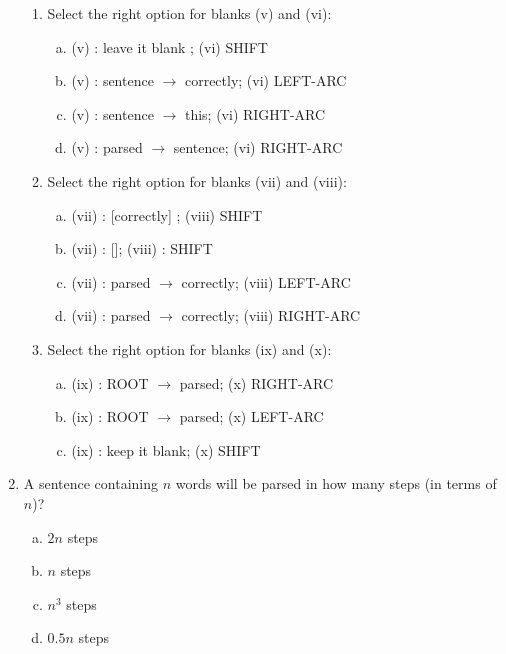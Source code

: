 \begin{enumerate}[1.]
\begin{enumerate}[4a.]

\item {} Select the right option for blanks (v) and (vi):

\begin{enumerate}[(a)]
\item (v) : leave it blank ; (vi) SHIFT
\item (v) : sentence $\rightarrow$ correctly; (vi) LEFT-ARC
\item (v) : sentence $\rightarrow$ this; (vi) RIGHT-ARC
\item (v) : parsed $\rightarrow$ sentence; (vi) RIGHT-ARC
\end{enumerate}


\item {} Select the right option for blanks (vii) and (viii):

\begin{enumerate}[(a)]
\item (vii) : [correctly] ; (viii) SHIFT
\item (vii) : []; (viii) : SHIFT
\item (vii) : parsed $\rightarrow$ correctly; (viii) LEFT-ARC
\item (vii) : parsed $\rightarrow$ correctly; (viii) RIGHT-ARC
\end{enumerate}


\item {} Select the right option for blanks (ix) and (x):

\begin{enumerate}[(a)]
\item (ix) : ROOT $\rightarrow$ parsed; (x) RIGHT-ARC
\item (ix) : ROOT $\rightarrow$ parsed; (x) LEFT-ARC
\item (ix) : keep it blank; (x) SHIFT
\end{enumerate}


\end{enumerate}

\item {} A sentence containing $n$ words will be parsed in how many steps (in terms of $n$)?

\begin{enumerate}[(a)]
\item $2n$ steps
\item $n$ steps
\item $n^3$ steps
\item $0.5n$ steps
\end{enumerate}


\end{enumerate}
